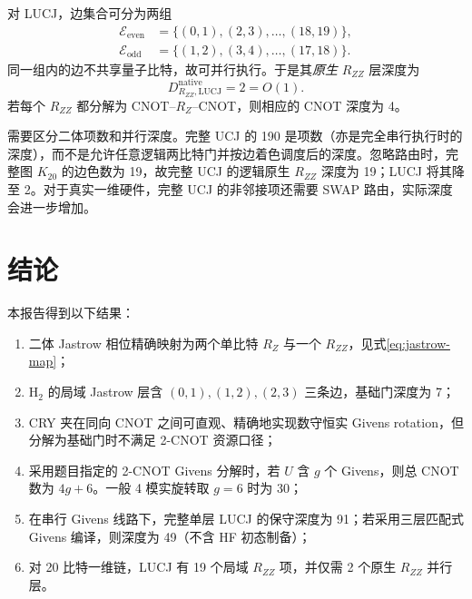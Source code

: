 \documentclass[11pt,a4paper]{ctexart}
\begin{document}
对 LUCJ，边集合可分为两组
\begin{align}
    \mathcal E_{\mathrm{even}}&=\{(0,1),(2,3),\ldots,(18,19)\},\\
    \mathcal E_{\mathrm{odd}}&=\{(1,2),(3,4),\ldots,(17,18)\}.
\end{align}
同一组内的边不共享量子比特，故可并行执行。于是其\emph{原生} $R_{ZZ}$ 层深度为
\begin{equation}
    \boxed{D^{\mathrm{native}}_{R_{ZZ},\mathrm{LUCJ}}=2=O(1).}
\end{equation}
若每个 $R_{ZZ}$ 都分解为 CNOT--$R_Z$--CNOT，则相应的 CNOT 深度为 4。

需要区分二体项数和并行深度。完整 UCJ 的 190 是项数（亦是完全串行执行时的深度），而不是允许任意逻辑两比特门并按边着色调度后的深度。忽略路由时，完整图 $K_{20}$ 的边色数为 19，故完整 UCJ 的逻辑原生 $R_{ZZ}$ 深度为 19；LUCJ 将其降至 2。对于真实一维硬件，完整 UCJ 的非邻接项还需要 SWAP 路由，实际深度会进一步增加。

\section{结论}

本报告得到以下结果：
\begin{enumerate}
    \item 二体 Jastrow 相位精确映射为两个单比特 $R_Z$ 与一个 $R_{ZZ}$，见式\eqref{eq:jastrow-map}；
    \item H$_2$ 的局域 Jastrow 层含 $(0,1),(1,2),(2,3)$ 三条边，基础门深度为 7；
    \item CRY 夹在同向 CNOT 之间可直观、精确地实现数守恒实 Givens rotation，但分解为基础门时不满足 2-CNOT 资源口径；
    \item 采用题目指定的 2-CNOT Givens 分解时，若 $U$ 含 $g$ 个 Givens，则总 CNOT 数为 $4g+6$。一般 4 模实旋转取 $g=6$ 时为 30；
    \item 在串行 Givens 线路下，完整单层 LUCJ 的保守深度为 91；若采用三层匹配式 Givens 编译，则深度为 49（不含 HF 初态制备）；
    \item 对 20 比特一维链，LUCJ 有 19 个局域 $R_{ZZ}$ 项，并仅需 2 个原生 $R_{ZZ}$ 并行层。
\end{enumerate}
\end{document}
